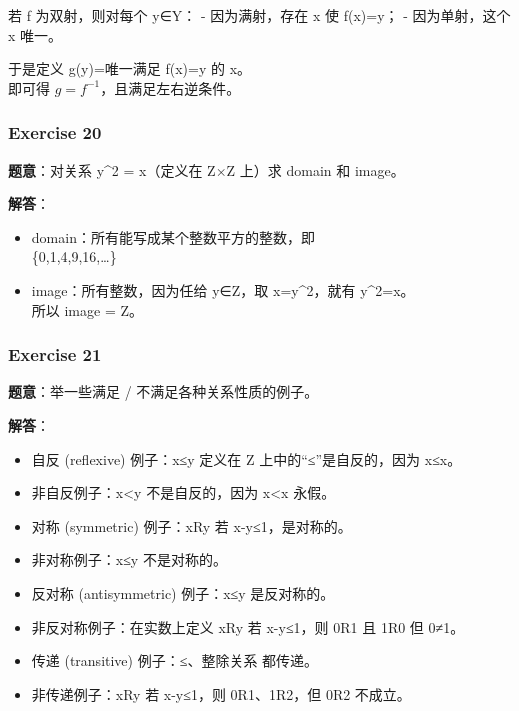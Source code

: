 \documentclass[
  11pt,
]{article}
\providecommand{\tightlist}{%
  \setlength{\itemsep}{0pt}\setlength{\parskip}{0pt}}
\begin{document}
若 f 为双射，则对每个 y∈Y： - 因为满射，存在 x 使 f(x)=y； -
因为单射，这个 x 唯一。

于是定义 g(y)=唯一满足 f(x)=y 的 x。\\
即可得 \(g=f^{-1}\)，且满足左右逆条件。

\subsubsection{Exercise 20}\label{exercise-20}

\textbf{题意}：对关系 y\^{}2 = x（定义在 Z×Z 上）求 domain 和 image。

\textbf{解答}：

\begin{itemize}
\tightlist
\item
  domain：所有能写成某个整数平方的整数，即\\
  \{0,1,4,9,16,\ldots\}
\item
  image：所有整数，因为任给 y∈Z，取 x=y\^{}2，就有 y\^{}2=x。\\
  所以 image = Z。
\end{itemize}

\subsubsection{Exercise 21}\label{exercise-21}

\textbf{题意}：举一些满足 / 不满足各种关系性质的例子。

\textbf{解答}：

\begin{itemize}
\item
  自反 (reflexive) 例子：x≤y 定义在 Z 上中的``≤''是自反的，因为 x≤x。
\item
  非自反例子：x\textless y 不是自反的，因为 x\textless x 永假。
\item
  对称 (symmetric) 例子：xRy 若 \textbar x-y\textbar≤1，是对称的。
\item
  非对称例子：x≤y 不是对称的。
\item
  反对称 (antisymmetric) 例子：x≤y 是反对称的。
\item
  非反对称例子：在实数上定义 xRy 若 \textbar x-y\textbar≤1，则 0R1 且
  1R0 但 0≠1。
\item
  传递 (transitive) 例子：≤、整除关系 \textbar{} 都传递。
\item
  非传递例子：xRy 若 \textbar x-y\textbar≤1，则 0R1、1R2，但 0R2
  不成立。
\end{itemize}
\end{document}
